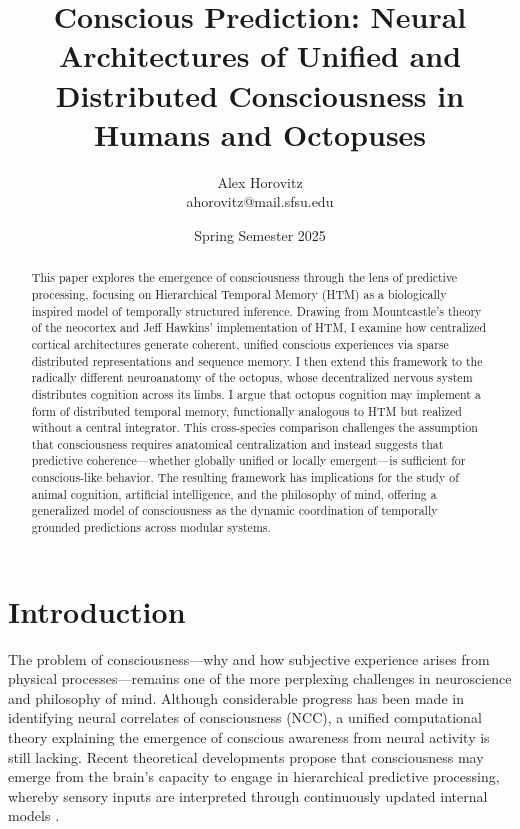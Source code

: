 \documentclass{article}
\title{Conscious Prediction: Neural Architectures of Unified and Distributed Consciousness in Humans and Octopuses}
\author{Alex Horovitz \\ \small ahorovitz@mail.sfsu.edu}
\date{Spring Semester 2025}
\begin{document}
\setlength{\parskip}{0.75em}
\maketitle
\begin{abstract}
This paper explores the emergence of consciousness through the lens of predictive processing, focusing on Hierarchical Temporal Memory (HTM) as a biologically inspired model of temporally structured inference. Drawing from Mountcastle’s theory of the neocortex and Jeff Hawkins’ implementation of HTM, I examine how centralized cortical architectures generate coherent, unified conscious experiences via sparse distributed representations and sequence memory. I then extend this framework to the radically different neuroanatomy of the octopus, whose decentralized nervous system distributes cognition across its limbs. I argue that octopus cognition may implement a form of distributed temporal memory, functionally analogous to HTM but realized without a central integrator. This cross-species comparison challenges the assumption that consciousness requires anatomical centralization and instead suggests that predictive coherence—whether globally unified or locally emergent—is sufficient for conscious-like behavior. The resulting framework has implications for the study of animal cognition, artificial intelligence, and the philosophy of mind, offering a generalized model of consciousness as the dynamic coordination of temporally grounded predictions across modular systems.
\end{abstract}


\section{Introduction}

The problem of consciousness---why and how subjective experience arises from physical processes---remains one of the more perplexing challenges in neuroscience and philosophy of mind. Although considerable progress has been made in identifying neural correlates of consciousness (NCC), a unified computational theory explaining the emergence of conscious awareness from neural activity is still lacking. Recent theoretical developments propose that consciousness may emerge from the brain's capacity to engage in hierarchical predictive processing, whereby sensory inputs are interpreted through continuously updated internal models \parencite{clark2016surfing, friston2010free}.
\end{document}
